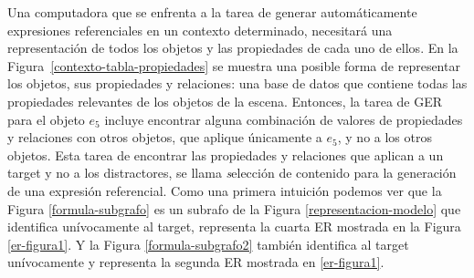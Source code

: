 \vspace*{-2cm}Una computadora que se enfrenta a la tarea de generar autom\'aticamente expresiones referenciales en un contexto determinado, necesitar\'a una representaci\'on de todos los objetos y las propiedades de cada uno de ellos. En la Figura~\ref{contexto-tabla-propiedades} se muestra una posible forma de representar los objetos, sus propiedades y relaciones: una base de datos que contiene todas las propiedades relevantes de los objetos de la escena. Entonces, la tarea de GER para el objeto $e_5$ incluye encontrar alguna combinaci\'on de valores de propiedades y relaciones con otros objetos, que aplique \'unicamente a $e_5$, y no a los otros objetos. Esta tarea de encontrar las propiedades y relaciones que aplican a un target y no a los distractores, se llama {\emph selecci\'on de contenido para la generaci\'on de una expresi\'on referencial}.
Como una primera intuici\'on podemos ver que la Figura \ref{formula-subgrafo} es un subrafo de la Figura \ref{representacion-modelo} que identifica un\'ivocamente al target, representa la cuarta ER mostrada en la Figura \ref{er-figura1}. Y la Figura \ref{formula-subgrafo2} tambi\'en identifica al target un\'ivocamente y representa la segunda ER mostrada en \ref{er-figura1}.

